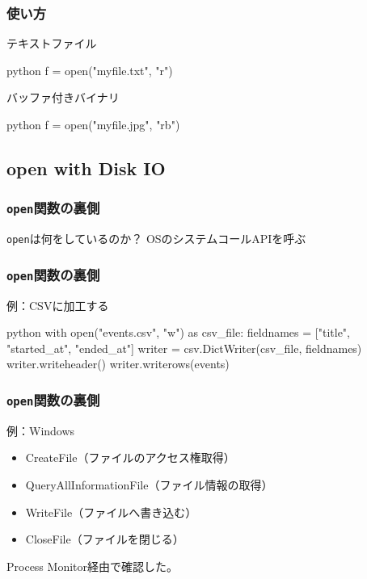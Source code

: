 \documentclass[aspectratio=169,dvipdfmx,14pt,notheorems]{beamer}
\theoremstyle{definition}
\begin{document}
\begin{frame}[fragile]\frametitle{使い方}

\begin{exampleblock}{テキストファイル}
\begin{pygments}{python}
f = open("myfile.txt", "r")
\end{pygments}
\end{exampleblock}

\begin{exampleblock}{バッファ付きバイナリ}
\begin{pygments}{python}
f = open("myfile.jpg", "rb")
\end{pygments}
\end{exampleblock}

\end{frame}

\subsection{open with Disk IO}

\begin{frame}\frametitle{\texttt{open}関数の裏側}
\begin{block}{\texttt{open}は何をしているのか？}
OSのシステムコールAPIを呼ぶ
\end{block}
\end{frame}

\begin{frame}[fragile]\frametitle{\texttt{open}関数の裏側}

\begin{exampleblock}{例：CSVに加工する}
\begin{pygments}{python}
with open("events.csv", "w") as csv_file:
    fieldnames = ["title", "started_at", "ended_at"]
    writer = csv.DictWriter(csv_file, fieldnames)
    writer.writeheader()
    writer.writerows(events)
\end{pygments}
\end{exampleblock}

\end{frame}

\begin{frame}[fragile]\frametitle{\texttt{open}関数の裏側}

\begin{exampleblock}{例：Windows}
\begin{itemize}
\item CreateFile（ファイルのアクセス権取得）
\item QueryAllInformationFile（ファイル情報の取得）
\item WriteFile（ファイルへ書き込む）
\item CloseFile（ファイルを閉じる）
\end{itemize}
\end{exampleblock}
Process Monitor経由で確認した。
\end{frame}
\end{document}
